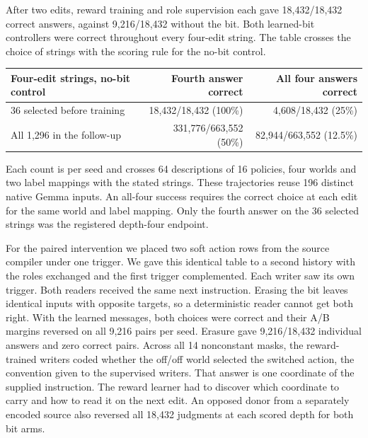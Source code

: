 \documentclass[11pt]{article}
\begin{document}
After two edits, reward training and role supervision each gave 18,432/18,432 correct answers, against 9,216/18,432 without the bit. Both learned-bit controllers were correct throughout every four-edit string. The table crosses the choice of strings with the scoring rule for the no-bit control.

\begin{center}
\small\renewcommand{\arraystretch}{1.15}
\begin{tabular}{@{}lrr@{}}
\toprule
Four-edit strings, no-bit control & Fourth answer correct & All four answers correct \\
\midrule
36 selected before training & 18,432/18,432 (100\%) & 4,608/18,432 (25\%) \\
All 1,296 in the follow-up & 331,776/663,552 (50\%) & 82,944/663,552 (12.5\%) \\
\bottomrule
\end{tabular}
\end{center}

{\footnotesize Each count is per seed and crosses 64 descriptions of 16 policies, four worlds and two label mappings with the stated strings. These trajectories reuse 196 distinct native Gemma inputs. An all-four success requires the correct choice at each edit for the same world and label mapping. Only the fourth answer on the 36 selected strings was the registered depth-four endpoint.\par}

For the paired intervention we placed two soft action rows from the source compiler under one trigger. We gave this identical table to a second history with the roles exchanged and the first trigger complemented. Each writer saw its own trigger. Both readers received the same next instruction. Erasing the bit leaves identical inputs with opposite targets, so a deterministic reader cannot get both right. With the learned messages, both choices were correct and their A/B margins reversed on all 9,216 pairs per seed. Erasure gave 9,216/18,432 individual answers and zero correct pairs. Across all 14 nonconstant masks, the reward-trained writers coded whether the off/off world selected the switched action, the convention given to the supervised writers. That answer is one coordinate of the supplied instruction. The reward learner had to discover which coordinate to carry and how to read it on the next edit. An opposed donor from a separately encoded source also reversed all 18,432 judgments at each scored depth for both bit arms.
\end{document}
